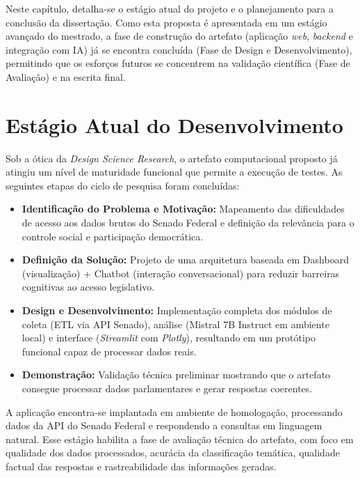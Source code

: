 Neste capítulo, detalha-se o estágio atual do projeto e o planejamento para a conclusão da dissertação. Como esta proposta é apresentada em um estágio avançado do mestrado, a fase de construção do artefato (aplicação \textit{web}, \textit{backend} e integração com IA) já se encontra concluída (Fase de Design e Desenvolvimento), permitindo que os esforços futuros se concentrem na validação científica (Fase de Avaliação) e na escrita final.

\section{Estágio Atual do Desenvolvimento}

Sob a ótica da \textit{Design Science Research}, o artefato computacional proposto já atingiu um nível de maturidade funcional que permite a execução de testes. As seguintes etapas do ciclo de pesquisa foram concluídas:

\begin{itemize}
    \item \textbf{Identificação do Problema e Motivação:} Mapeamento das dificuldades de acesso aos dados brutos do Senado Federal e definição da relevância para o controle social e participação democrática.

    \item \textbf{Definição da Solução:} Projeto de uma arquitetura baseada em Dashboard (visualização) + Chatbot (interação conversacional) para reduzir barreiras cognitivas ao acesso legislativo.

    \item \textbf{Design e Desenvolvimento:} Implementação completa dos módulos de coleta (ETL via API Senado), análise (Mistral 7B Instruct em ambiente local) e interface (\textit{Streamlit} com \textit{Plotly}), resultando em um protótipo funcional capaz de processar dados reais.

    \item \textbf{Demonstração:} Validação técnica preliminar mostrando que o artefato consegue processar dados parlamentares e gerar respostas coerentes.
\end{itemize}

A aplicação encontra-se implantada em ambiente de homologação, processando dados da API do Senado Federal e respondendo a consultas em linguagem natural. Esse estágio habilita a fase de avaliação técnica do artefato, com foco em qualidade dos dados processados, acurácia da classificação temática, qualidade factual das respostas e rastreabilidade das informações geradas.

